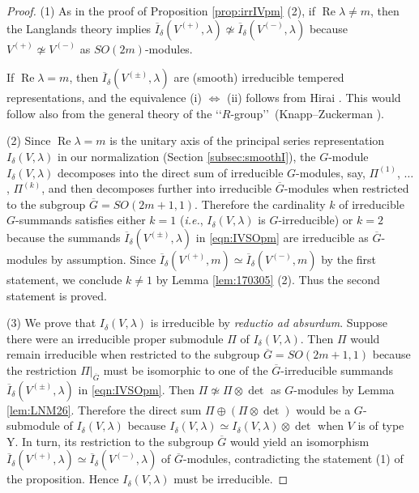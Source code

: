 \begin{proof}
(1)\enspace
As in the proof of Proposition \ref{prop:irrIVpm} (2), 
 if $\operatorname{Re}\lambda \ne m$, 
 then the Langlands theory \cite{La88} implies
 $\overline I_{\delta}(V^{(+)},\lambda) \not \simeq \overline I_{\delta}(V^{(-)},\lambda)$
 because $V^{(+)} \not \simeq V^{(-)}$
 as $SO(2m)$-modules.  


If $\operatorname{Re}\lambda = m$, 
 then $\overline I_{\delta}(V^{(\pm)},\lambda)$ are (smooth)
 irreducible tempered representations,
 and the equivalence
 (i) $\Leftrightarrow$ (ii) follows from Hirai \cite{Hirai62}.  
This would follow also from the general theory 
 of the \lq\lq{$R$-group}\rq\rq\ (Knapp--Zuckerman \cite{KZ}).  
\par\noindent
(2)\enspace
Since $\operatorname{Re}\lambda = m$ is the unitary axis
 of the principal series representation
 $I_{\delta}(V,\lambda)$ 
 in our normalization
 (Section \ref{subsec:smoothI}), 
 the $G$-module $I_{\delta}(V,\lambda)$ decomposes into the direct sum
 of irreducible $G$-modules,
 say, 
 $\Pi^{(1)}$, $\dots$, $\Pi^{(k)}$, 
 and then decomposes further into irreducible $\overline G$-modules
 when restricted to the subgroup 
 $\overline G=SO(2m+1,1)$.  
Therefore the cardinality $k$ of irreducible $G$-summands satisfies
 either $k=1$
 ({\it{i.e.}}, $I_{\delta}(V,\lambda)$ is $G$-irreducible)
 or $k=2$ because the summands $\overline I_{\delta}(V^{(\pm)},\lambda)$ 
 in \eqref{eqn:IVSOpm} are irreducible as $\overline G$-modules
 by assumption.  
Since $\overline I_{\delta}(V^{(+)},m)
 \simeq \overline I_{\delta}(V^{(-)},m)$
 by the first statement, 
 we conclude $k \ne 1$ 
 by Lemma \ref{lem:170305} (2).  
Thus the second statement is proved.  
\par\noindent
(3)\enspace
We prove 
 that $I_{\delta}(V,\lambda)$ is irreducible
 by {\it{reductio ad absurdum}}.  
Suppose there were an irreducible proper submodule $\Pi$
 of $I_{\delta}(V,\lambda)$.  
Then $\Pi$ would remain irreducible 
 when restricted to the subgroup $\overline G=SO(2m+1,1)$
 because the restriction $\Pi|_{\overline G}$ must be isomorphic 
 to one of the $\overline G$-irreducible summands
 $\overline I_{\delta}(V^{(\pm)},\lambda)$ 
 in \eqref{eqn:IVSOpm}.  
Then $\Pi \not \simeq \Pi \otimes \det$
 as $G$-modules
 by Lemma \ref{lem:LNM26}.  
Therefore the direct sum $\Pi \oplus (\Pi \otimes \det)$ would be a $G$-submodule
 of $I_{\delta}(V,\lambda)$
 because $I_{\delta}(V,\lambda) \simeq I_{\delta}(V,\lambda) \otimes \det$
 when $V$ is of type Y.  
In turn, 
 its restriction to the subgroup $\overline G$ would yield 
 an isomorphism 
 $\overline I_{\delta}(V^{(+)},\lambda) \simeq \overline I_{\delta}(V^{(-)},\lambda)$ of $\overline G$-modules,
 contradicting the statement (1)
 of the proposition.  
Hence $I_{\delta}(V,\lambda)$ must be irreducible.  
\end{proof}

